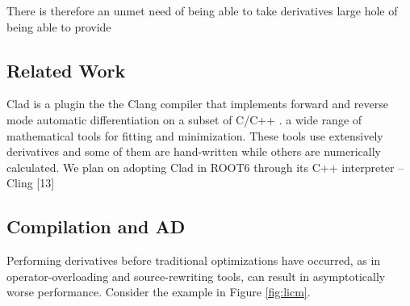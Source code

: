 There is therefore an unmet need of being able to take derivatives large hole of being able to provide 



\subsection{Related Work}

Clad is a plugin the the Clang compiler that implements forward and reverse mode automatic differentiation on a subset of C/C++ \cite{Vassilev_Clad}.
a wide range of mathematical tools for fitting and minimization. These tools use extensively
derivatives and some of them are hand-written while others are numerically calculated. We plan
on adopting Clad in ROOT6 through its C++ interpreter – Cling [13]

\subsection{Compilation and AD}
Performing derivatives before traditional optimizations have occurred, as in operator-overloading and source-rewriting tools, can result in asymptotically worse performance. Consider the example in Figure \ref{fig:licm}.

